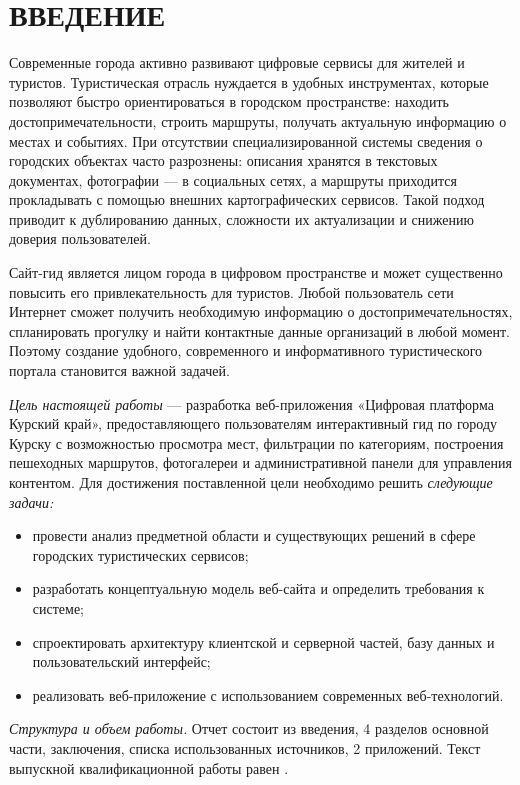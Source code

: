 \section*{ВВЕДЕНИЕ}

Современные города активно развивают цифровые сервисы для жителей и туристов. Туристическая отрасль нуждается в удобных инструментах, которые позволяют быстро ориентироваться в городском пространстве: находить достопримечательности, строить маршруты, получать актуальную информацию о местах и событиях. При отсутствии специализированной системы сведения о городских объектах часто разрознены: описания хранятся в текстовых документах, фотографии — в социальных сетях, а маршруты приходится прокладывать с помощью внешних картографических сервисов. Такой подход приводит к дублированию данных, сложности их актуализации и снижению доверия пользователей.

Сайт-гид является лицом города в цифровом пространстве и может существенно повысить его привлекательность для туристов. Любой пользователь сети Интернет сможет получить необходимую информацию о достопримечательностях, спланировать прогулку и найти контактные данные организаций в любой момент. Поэтому создание удобного, современного и информативного туристического портала становится важной задачей.

\emph{Цель настоящей работы} --- разработка веб-приложения «Цифровая платформа Курский край», предоставляющего пользователям интерактивный гид по городу Курску с возможностью просмотра мест, фильтрации по категориям, построения пешеходных маршрутов, фотогалереи и административной панели для управления контентом. Для достижения поставленной цели необходимо решить \emph{следующие задачи:}
\begin{itemize}
\item провести анализ предметной области и существующих решений в сфере городских туристических сервисов;
\item разработать концептуальную модель веб-сайта и определить требования к системе;
\item спроектировать архитектуру клиентской и серверной частей, базу данных и пользовательский интерфейс;
\item реализовать веб-приложение с использованием современных веб-технологий.
\end{itemize}

\emph{Структура и объем работы.} Отчет состоит из введения, 4 разделов основной части, заключения, списка использованных источников, 2 приложений. Текст выпускной квалификационной работы равен .


